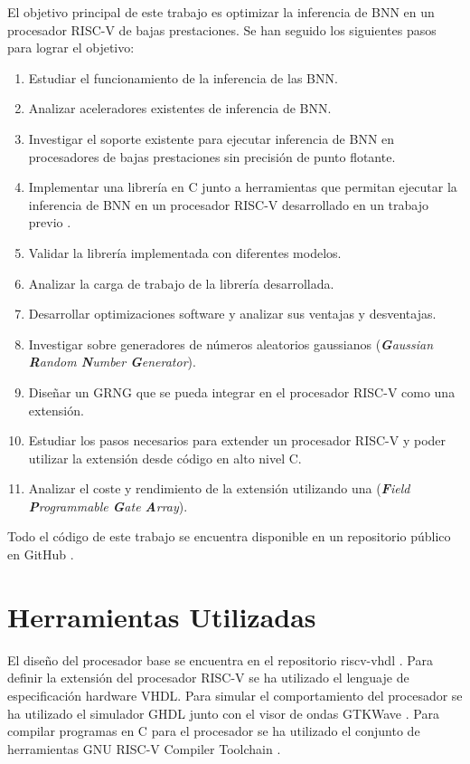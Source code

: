 El objetivo principal de este trabajo es optimizar la inferencia de BNN en un procesador RISC-V de bajas prestaciones. Se han seguido los siguientes pasos para lograr el objetivo:
\begin{enumerate}
    \item Estudiar el funcionamiento de la inferencia de las BNN.
    \item Analizar aceleradores existentes de inferencia de BNN.
    \item Investigar el soporte existente para ejecutar inferencia de BNN en procesadores de bajas prestaciones sin precisión de punto flotante.
    \item Implementar una librería en C junto a herramientas que permitan ejecutar la inferencia de BNN en un procesador RISC-V desarrollado en un trabajo previo \cite{riscv_tfg}.
    \item Validar la librería implementada con diferentes modelos.
    \item Analizar la carga de trabajo de la librería desarrollada.
    \item Desarrollar optimizaciones software y analizar sus ventajas y desventajas.
    \item Investigar sobre generadores de números aleatorios gaussianos (\textit{\textbf{G}aussian \textbf{R}andom \textbf{N}umber \textbf{G}enerator}).
    \item Diseñar un GRNG que se pueda integrar en el procesador RISC-V como una extensión.
    \item Estudiar los pasos necesarios para extender un procesador RISC-V y poder utilizar la extensión desde código en alto nivel C.
    \item Analizar el coste y rendimiento de la extensión utilizando una (\textit{\textbf{F}ield \textbf{P}rogrammable \textbf{G}ate \textbf{A}rray}).
\end{enumerate}

Todo el código de este trabajo se encuentra disponible en un repositorio público en GitHub \cite{bnn_github}.


\section{Herramientas Utilizadas}

El diseño del procesador base se encuentra en el repositorio riscv-vhdl \cite{base_riscv_cpu_git}. Para definir la extensión del procesador RISC-V se ha utilizado el lenguaje de especificación hardware VHDL. Para simular el comportamiento del procesador se ha utilizado el simulador GHDL \cite{ghdl} junto con el visor de ondas GTKWave \cite{gtkwave}. Para compilar programas en C para el procesador se ha utilizado el conjunto de herramientas GNU RISC-V Compiler Toolchain \cite{gcc_riscv}. 


